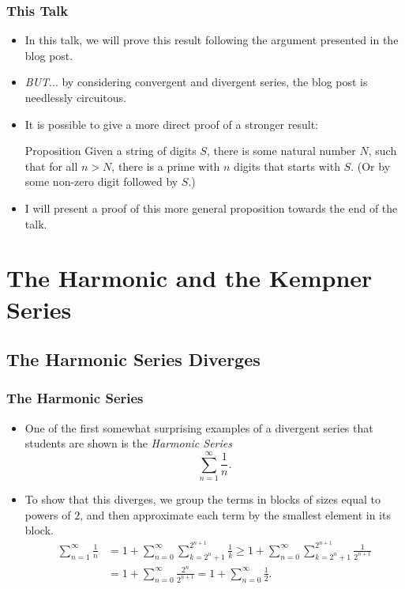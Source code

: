 \documentclass{beamer}
\begin{document}
\begin{frame}
    \frametitle{This Talk}

    \begin{itemize}
        \item In this talk, we will prove this result following the argument presented in the blog post. \pause
        \item \emph{BUT}... by considering convergent and divergent series, the blog post is needlessly circuitous. \pause
        \item It is possible to give a more direct proof of a stronger result:
        \begin{block}{Proposition}
            Given a string of digits $S$, there is some natural number $N$, such that for all $n > N$, there is a prime with $n$ digits that starts with $S$. (Or by some non-zero digit followed by $S$.)
        \end{block} \pause
        \item I will present a proof of this more general proposition towards the end of the talk.
    \end{itemize}    

\end{frame}

\section{The Harmonic and the Kempner Series}
\subsection{The Harmonic Series Diverges}

\begin{frame}
    \frametitle{The Harmonic Series}

    \begin{itemize}
        \item One of the first somewhat surprising examples of a divergent series that students are shown is the \emph{Harmonic Series}
        \[
            \sum_{n = 1}^{\infty} \frac{1}{n}.    
        \]
        \item To show that this diverges, we group the terms in blocks of sizes equal to powers of $2$, and then approximate each term by the smallest element in its block.
        \begin{align*}
            \sum_{n = 1}^{\infty} \frac{1}{n} & = 1 + \sum_{n = 0}^{\infty} \sum_{k = 2^n + 1}^{2^{n + 1}} \frac{1}{k} \geq 1 + \sum_{n = 0}^\infty \sum_{k = 2^n + 1}^{2^{n + 1}} \frac{1}{2^{n + 1}} \\
            & = 1 + \sum_{n = 0}^{\infty} \frac{2^n}{2^{n + 1}} = 1 + \sum_{n = 0}^{\infty} \frac{1}{2}.
        \end{align*}
    \end{itemize}

\end{frame}
\end{document}
